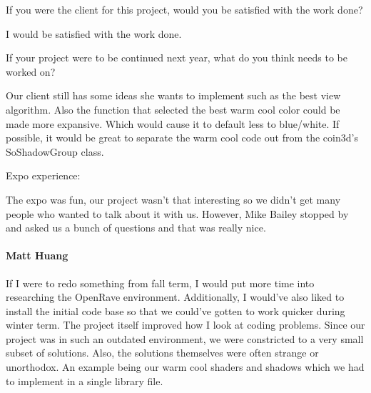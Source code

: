 {If you were the client for this project, would you be satisfied with the work done? \\ \par \vspace{3mm}

I would be satisfied with the work done. \\ \par \vspace{3mm}

If your project were to be continued next year, what do you think needs to be worked on? \\ \par \vspace{3mm}

Our client still has some ideas she wants to implement such as the best view algorithm. 
Also the function that selected the best warm cool color could be made more expansive. 
Which would cause it to default less to blue/white. 
If possible, it would be great to separate the warm cool code out from the coin3d's SoShadowGroup class. \\ \par \vspace{3mm}

Expo experience: \\ \par \vspace{3mm}

The expo was fun, our project wasn't that interesting so we didn't get many people who wanted to talk about it with us. 
However, Mike Bailey stopped by and asked us a bunch of questions and that was really nice. \\ \par \vspace{3mm}
\vspace{3mm}

\paragraph{Matt Huang}
If I were to redo something from fall term, I would put more time into researching the OpenRave environment. 
Additionally, I would've also liked to install the initial code base so that we could've gotten to work quicker during winter term.
The project itself improved how I look at coding problems. 
Since our project was in such an outdated environment, we were constricted to a very small subset of solutions. 
Also, the solutions themselves were often strange or unorthodox. 
An example being our warm cool shaders and shadows which we had to implement in a single library file. \\ \par \vspace{3mm}

}
